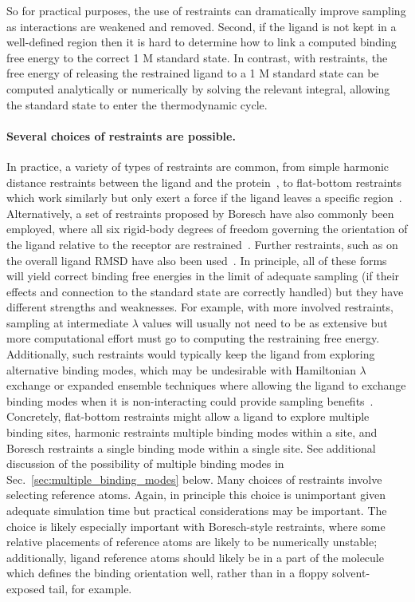 \documentclass[9pt,bestpractices]{livecoms}
\begin{document}
So for practical purposes, the use of restraints can dramatically improve sampling as interactions are weakened and removed.
Second, if the ligand is not kept in a well-defined region then it is hard to determine how to link a computed binding free energy to the correct 1 M standard state.
In contrast, with restraints, the free energy of releasing the restrained ligand to a 1 M standard state can be computed analytically or numerically by solving the relevant integral, allowing the standard state to enter the thermodynamic cycle.
%
\paragraph{Several choices of restraints are possible.}
In practice, a variety of types of restraints are common, from simple harmonic distance restraints between the ligand and the protein~\cite{mobley2006use}, to flat-bottom restraints which work similarly but only exert a force if the ligand leaves a specific region~\cite{chen2007can}.
%
Alternatively, a set of restraints proposed by Boresch have also commonly been employed, where all six rigid-body degrees of freedom governing the orientation of the ligand relative to the receptor are restrained~\cite{boresch2003absolutea, leitgeb2005alchemical}.
Further restraints, such as on the overall ligand RMSD have also been used~\cite{woo2005calculation}.
%
In principle, all of these forms will yield correct binding free energies in the limit of adequate sampling (if their effects and connection to the standard state are correctly handled) but they have different strengths and weaknesses.
For example, with more involved restraints, sampling at intermediate $\lambda$ values will usually not need to be as extensive but more computational effort must go to computing the restraining free energy.
Additionally, such restraints would typically keep the ligand from exploring alternative binding modes, which may be undesirable with Hamiltonian $\lambda$ exchange or expanded ensemble techniques where allowing the ligand to exchange binding modes when it is non-interacting could provide sampling benefits~\cite{wang2013identifying}.
Concretely, flat-bottom restraints might allow a ligand to explore multiple binding sites, harmonic restraints multiple binding modes within a site, and Boresch restraints a single binding mode within a single site.
See additional discussion of the possibility of multiple binding modes in Sec.~\ref{sec:multiple_binding_modes} below.
%
Many choices of restraints involve selecting reference atoms.
Again, in principle this choice is unimportant given adequate simulation time but practical considerations may be important.
The choice is likely especially important with Boresch-style restraints, where some relative placements of reference atoms are likely to be numerically unstable; additionally, ligand reference atoms should likely be in a part of the molecule which defines the binding orientation well, rather than in a floppy solvent-exposed tail, for example.
%
%
\end{document}
